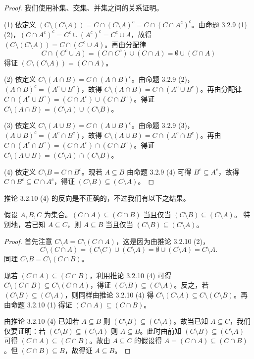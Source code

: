 \begin{proof}
我们使用补集、交集、并集之间的关系证明。

(1) 依定义 $(C \setminus (C \setminus A)) = C \cap (C \setminus A)^c = C \cap (C \cap A^c)^c$。由命题 3.2.9 (1)(2)，$(C \cap A^c)^c = C^c \cup (A^c)^c = C^c \cup A$，故得 $(C \setminus (C \setminus A)) = C \cap (C^c \cup A)$。再由分配律
$$ C \cap (C^c \cup A) = (C \cap C^c) \cup (C \cap A) = \emptyset \cup (C \cap A) $$
得证 $(C \setminus (C \setminus A)) = (C \cap A)$。

(2) 依定义 $C \setminus (A \cap B) = C \cap (A \cap B)^c$。由命题 3.2.9 (2)，$(A \cap B)^c = (A^c \cup B^c)$，故得 $C \setminus (A \cap B) = C \cap (A^c \cup B^c)$。再由分配律 $C \cap (A^c \cup B^c) = (C \cap A^c) \cup (C \cap B^c)$。得证 $C \setminus (A \cap B) = (C \setminus A) \cup (C \setminus B)$。

(3) 依定义 $C \setminus (A \cup B) = C \cap (A \cup B)^c$。由命题 3.2.9 (3)，$(A \cup B)^c = (A^c \cap B^c)$，故得 $C \setminus (A \cup B) = C \cap (A^c \cap B^c)$。再由 $C \cap (A^c \cap B^c) = (C \cap A^c) \cap (C \cap B^c)$。得证 $C \setminus (A \cup B) = (C \setminus A) \cap (C \setminus B)$。

(4) 依定义 $C \setminus B = C \cap B^c$。现若 $A \subseteq B$ 由命题 3.2.9 (4) 可得 $B^c \subseteq A^c$，故得 $C \cap B^c \subseteq C \cap A^c$，得证 $(C \setminus B) \subseteq (C \setminus A)$。
\end{proof}

推论 3.2.10 (4) 的反向是不正确的，不过我们有以下之结果。

\begin{proposition}
假设 $A, B, C$ 为集合。$(C \cap A) \subseteq (C \cap B)$ 当且仅当 $(C \setminus B) \subseteq (C \setminus A)$。
特别地，若已知 $A \subseteq C$，则 $A \subseteq B$ 当且仅当 $(C \setminus B) \subseteq (C \setminus A)$。
\end{proposition}

\begin{proof}
首先注意 $C \setminus A = C \setminus (C \cap A)$，这是因为由推论 3.2.10 (2)，
$$ C \setminus (C \cap A) = (C \setminus C) \cup (C \setminus A) = \emptyset \cup (C \setminus A) = C \setminus A. $$
同理 $C \setminus B = C \setminus (C \cap B)$。

现若 $(C \cap A) \subseteq (C \cap B)$，利用推论 3.2.10 (4) 可得 $C \setminus (C \cap B) \subseteq C \setminus (C \cap A)$，得证 $(C \setminus B) \subseteq (C \setminus A)$。反之，若 $(C \setminus B) \subseteq (C \setminus A)$，则同样由推论 3.2.10 (4) 得 $C \setminus (C \setminus A) \subseteq C \setminus (C \setminus B)$。再由命题 3.2.10 (1) 得证 $(C \cap A) \subseteq (C \cap B)$。

由推论 3.2.10 (4) 已知若 $A \subseteq B$ 则 $(C \setminus B) \subseteq (C \setminus A)$。故当已知 $A \subseteq C$，我们仅要证明：若 $(C \setminus B) \subseteq (C \setminus A)$ 则 $A \subseteq B$。此时由前知 $(C \setminus B) \subseteq (C \setminus A)$ 可得 $(C \cap A) \subseteq (C \cap B)$。故由 $A \subseteq C$ 的假设得 $A = (C \cap A) \subseteq (C \cap B)$。但 $(C \cap B) \subseteq B$，故得证 $A \subseteq B$。
\end{proof}

